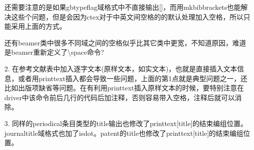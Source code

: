 \begin{texlist}
%

\end{texlist}

还需要注意的是如果gbtypeflag域格式中不直接输出[]，而用mkbibbrackets也能解决这些个问题，但是会因为ctex对于中英文间空格的的默认处理加入空格，所以只能采用上面的方式。

还有beamer类中很多不同域之间的空格似乎比其它类中更宽，不知道原因，难道是beamer重新定义了\textbackslash space命令?

2. 在参考文献表中加入逐字文本(原样文本，如实文本)，也就是直接插入文本信息，或者用printtext插入都会导致一些问题，上面的第1点就是典型问题之一，还比如出版项缺省等问题。在有利用printtext插入原样文本的时候，要特别注意在driver中该命令前后几行的代码后加注释，否则容易带入空格，注释后就可以消除。

3. 同样的periodical条目类型的title输出也修改了printtext[title]的结束编组位置。journaltitle域格式也加了isdot。patent的title也修改了printtext[title]的结束编组位置。

